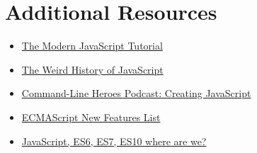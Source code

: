 \section{Additional Resources}

\begin{itemize}[leftmargin=*]
    \item \href{https://javascript.info/}{The Modern JavaScript Tutorial}
    \item \href{https://javascriptweekly.com/link/66136/f8cbfdb908}{The Weird History of JavaScript}
    \item \href{https://www.redhat.com/en/command-line-heroes/season-3/creating-javascript}{Command-Line Heroes Podcast: Creating JavaScript}
    \item \href{https://github.com/daumann/ECMAScript-new-features-list}{ECMAScript New Features List}
    \item \href{https://medium.com/engineered-publicis-sapient/javascript-es6-es7-es10-where-are-we-8ac044dfd964}{JavaScript, ES6, ES7, ES10 where are we?}
\end{itemize}
